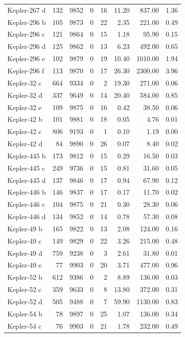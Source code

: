 \begin{table}
\begin{tabular}{lrrrrrrr}
Kepler-267 d & 132 & 9852 & 0 & 16 & 11.20 & 837.00 & 1.36 \\
Kepler-296 b & 105 & 9873 & 0 & 22 & 2.35 & 221.00 & 0.49 \\
Kepler-296 c & 121 & 9864 & 0 & 15 & 1.18 & 95.90 & 0.15 \\
Kepler-296 d & 125 & 9862 & 0 & 13 & 6.23 & 492.00 & 0.65 \\
Kepler-296 e & 102 & 9879 & 0 & 19 & 10.40 & 1010.00 & 1.94 \\
Kepler-296 f & 113 & 9870 & 0 & 17 & 26.30 & 2300.00 & 3.96 \\
Kepler-32 c & 664 & 9334 & 0 & 2 & 19.30 & 271.00 & 0.06 \\
Kepler-32 d & 337 & 9649 & 0 & 14 & 20.40 & 584.00 & 0.85 \\
Kepler-32 e & 109 & 9875 & 0 & 16 & 0.42 & 38.50 & 0.06 \\
Kepler-42 b & 101 & 9881 & 0 & 18 & 0.05 & 4.76 & 0.01 \\
Kepler-42 c & 806 & 9193 & 0 & 1 & 0.10 & 1.19 & 0.00 \\
Kepler-42 d & 84 & 9890 & 0 & 26 & 0.07 & 8.40 & 0.02 \\
Kepler-445 b & 173 & 9812 & 0 & 15 & 0.29 & 16.50 & 0.03 \\
Kepler-445 c & 249 & 9736 & 0 & 15 & 0.81 & 31.60 & 0.05 \\
Kepler-445 d & 137 & 9846 & 0 & 17 & 0.94 & 67.90 & 0.12 \\
Kepler-446 b & 146 & 9837 & 0 & 17 & 0.17 & 11.70 & 0.02 \\
Kepler-446 c & 104 & 9875 & 0 & 21 & 0.30 & 28.30 & 0.06 \\
Kepler-446 d & 134 & 9852 & 0 & 14 & 0.78 & 57.30 & 0.08 \\
Kepler-49 b & 165 & 9822 & 0 & 13 & 2.08 & 124.00 & 0.16 \\
Kepler-49 c & 149 & 9829 & 0 & 22 & 3.26 & 215.00 & 0.48 \\
Kepler-49 d & 759 & 9238 & 0 & 3 & 2.61 & 31.80 & 0.01 \\
Kepler-49 e & 77 & 9903 & 0 & 20 & 3.71 & 477.00 & 0.96 \\
Kepler-52 b & 612 & 9386 & 0 & 2 & 8.89 & 136.00 & 0.03 \\
Kepler-52 c & 359 & 9633 & 0 & 8 & 13.80 & 372.00 & 0.31 \\
Kepler-52 d & 505 & 9488 & 0 & 7 & 59.90 & 1130.00 & 0.83 \\
Kepler-54 b & 78 & 9897 & 0 & 25 & 1.07 & 136.00 & 0.34 \\
Kepler-54 c & 76 & 9903 & 0 & 21 & 1.78 & 232.00 & 0.49 \\

\end{tabular}
\end{table}
